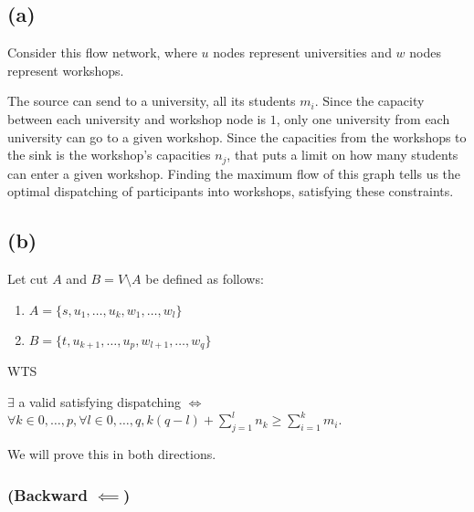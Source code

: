     
    \subsection*{(a)}
    
    Consider this flow network, where $u$ nodes represent universities and $w$ nodes represent workshops.
    
    The source can send to a university, all its students $m_i$. Since the capacity between each university and workshop node is $1$, only one university from each university can go to a given workshop. Since the capacities from the workshops to the sink is the workshop's capacities $n_j$, that puts a limit on how many students can enter a given workshop. Finding the maximum flow of this graph tells us the optimal dispatching of participants into workshops, satisfying these constraints.
    
    \subsection*{(b)}
    
    Let cut $A$ and $B = V \setminus A$ be defined as follows:
    \begin{enumerate}
        \item $A = \{s, u_1, \dots, u_k, w_1, \dots, w_l\}$
        \item $B = \{t, u_{k+1}, \dots, u_p, w_{l+1}, \dots, w_q\}$
    \end{enumerate}
    
    WTS
    
    $\exists$ a valid satisfying dispatching $\iff$ $\forall k \in {0, \dots, p}, \forall l \in {0, \dots, q}, k(q-l) + \sum_{j=1}^{l} n_k \geq \sum_{i=1}^{k} m_i$.
    
    We will prove this in both directions.
    
    
    
    \subsubsection*{(Backward $\impliedby$)}